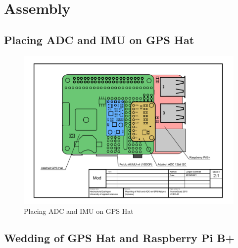 \chapter{Assembly}
\label{sec:assemb}

\section{Placing ADC and IMU on GPS Hat}
\label{sec:assemb:sensorsOnHat}
\begin{figure}[H]
    \centering
    \includegraphics[width=\textwidth]{fig/A4_tech_draw_topview_sensor_mountingPositions}
    \caption{Placing ADC and IMU on GPS Hat}
    \label{fig:assemb:sensorMount}
\end{figure}

\section{Wedding of GPS Hat and Raspberry Pi B+}
\label{sec:assemb:wedding}
